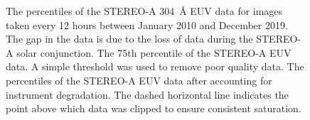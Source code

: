 \documentclass[11pt,a4paper,onecolumn]{report}
\begin{document}
\begin{figure}[t]%
  \qquad
\qquad
{}%
\qquad
{}%
  
  \caption[]{ The percentiles of the STEREO-A
  \SI{304}{\angstrom} EUV data for images taken every 12 hours between January 2010
  and December 2019. The gap in the data is due to the loss of data during the
  STEREO-A solar conjunction.  The 75th
  percentile of the STEREO-A EUV data. A simple threshold was used to remove poor
  quality data.  The percentiles of the
  STEREO-A EUV data after accounting for instrument degradation. The dashed
  horizontal line indicates the point above which data was clipped to ensure
  consistent saturation.}
  \label{fig:stereo_data_prep}
\end{figure}
\end{document}
